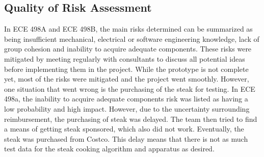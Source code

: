 \documentclass[11pt]{article}
\begin{document}
\subsection{Quality of Risk Assessment}

In ECE 498A and ECE 498B, the main risks determined can be summarized as being insufficient mechanical, electrical or software engineering knowledge, lack of group cohesion and inability to acquire adequate components.
These risks were mitigated by meeting regularly with consultants to discuss all potential ideas before implementing them in the project.
While the prototype is not complete yet, most of the risks were mitigated and the project went smoothly.
However, one situation that went wrong is the purchasing of the steak for testing.
In ECE 498a, the inability to acquire adequate components risk was listed as having a low probability and high impact.
However, due to the uncertainty surrounding reimbursement, the purchasing of steak was delayed.
The team then tried to find a means of getting steak sponsored, which also did not work.
Eventually, the steak was purchased from Costco.
This delay means that there is not as much test data for the steak cooking algorithm and apparatus as desired.
\end{document}
